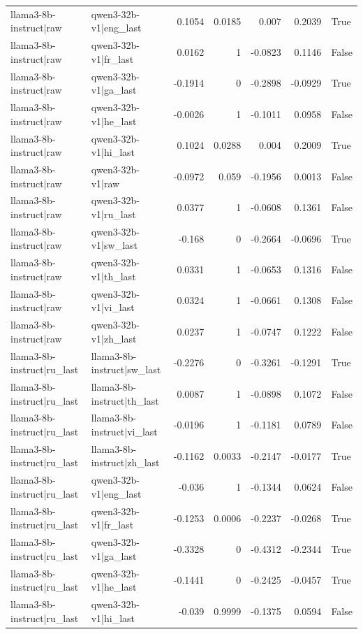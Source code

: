 \begin{table}
\begin{tabular}{l l r r r r l}
llama3-8b-instruct|raw & qwen3-32b-v1|eng_last & 0.1054 & 0.0185 & 0.007 & 0.2039 & True \\
llama3-8b-instruct|raw & qwen3-32b-v1|fr_last & 0.0162 & 1 & -0.0823 & 0.1146 & False \\
llama3-8b-instruct|raw & qwen3-32b-v1|ga_last & -0.1914 & 0 & -0.2898 & -0.0929 & True \\
llama3-8b-instruct|raw & qwen3-32b-v1|he_last & -0.0026 & 1 & -0.1011 & 0.0958 & False \\
llama3-8b-instruct|raw & qwen3-32b-v1|hi_last & 0.1024 & 0.0288 & 0.004 & 0.2009 & True \\
llama3-8b-instruct|raw & qwen3-32b-v1|raw & -0.0972 & 0.059 & -0.1956 & 0.0013 & False \\
llama3-8b-instruct|raw & qwen3-32b-v1|ru_last & 0.0377 & 1 & -0.0608 & 0.1361 & False \\
llama3-8b-instruct|raw & qwen3-32b-v1|sw_last & -0.168 & 0 & -0.2664 & -0.0696 & True \\
llama3-8b-instruct|raw & qwen3-32b-v1|th_last & 0.0331 & 1 & -0.0653 & 0.1316 & False \\
llama3-8b-instruct|raw & qwen3-32b-v1|vi_last & 0.0324 & 1 & -0.0661 & 0.1308 & False \\
llama3-8b-instruct|raw & qwen3-32b-v1|zh_last & 0.0237 & 1 & -0.0747 & 0.1222 & False \\
llama3-8b-instruct|ru_last & llama3-8b-instruct|sw_last & -0.2276 & 0 & -0.3261 & -0.1291 & True \\
llama3-8b-instruct|ru_last & llama3-8b-instruct|th_last & 0.0087 & 1 & -0.0898 & 0.1072 & False \\
llama3-8b-instruct|ru_last & llama3-8b-instruct|vi_last & -0.0196 & 1 & -0.1181 & 0.0789 & False \\
llama3-8b-instruct|ru_last & llama3-8b-instruct|zh_last & -0.1162 & 0.0033 & -0.2147 & -0.0177 & True \\
llama3-8b-instruct|ru_last & qwen3-32b-v1|eng_last & -0.036 & 1 & -0.1344 & 0.0624 & False \\
llama3-8b-instruct|ru_last & qwen3-32b-v1|fr_last & -0.1253 & 0.0006 & -0.2237 & -0.0268 & True \\
llama3-8b-instruct|ru_last & qwen3-32b-v1|ga_last & -0.3328 & 0 & -0.4312 & -0.2344 & True \\
llama3-8b-instruct|ru_last & qwen3-32b-v1|he_last & -0.1441 & 0 & -0.2425 & -0.0457 & True \\
llama3-8b-instruct|ru_last & qwen3-32b-v1|hi_last & -0.039 & 0.9999 & -0.1375 & 0.0594 & False \\

\end{tabular}
\end{table}
